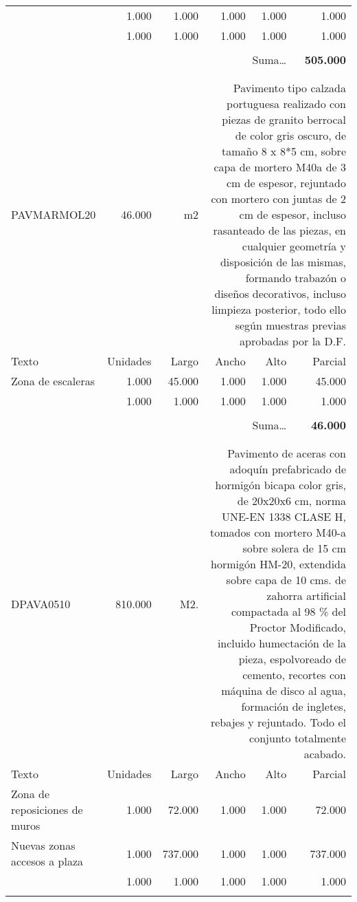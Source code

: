 \documentclass{book}%
\begin{document}
\begin{longtable}{lrrrrr}
\multicolumn{1}{p{3.5cm}}{}&1.000&1.000&1.000&1.000&1.000\\%
\multicolumn{1}{p{3.5cm}}{}&1.000&1.000&1.000&1.000&1.000\\%
&&&&&\\%
\multicolumn{5}{r}{Suma\ldots}&\textbf{505.000}\\%
\hline%
&&&&&\\%
&&&&&\\%
PAVMARMOL20&46.000& m2&\multicolumn{3}{p{6cm}}{\scriptsize Pavimento tipo calzada portuguesa realizado con piezas de granito berrocal de color gris oscuro, de tamaño 8 x 8*5 cm, sobre capa de mortero M40a de 3 cm de espesor, rejuntado con mortero con juntas de 2 cm de espesor, incluso rasanteado de las piezas, en cualquier geometría y disposición de las mismas, formando trabazón o diseños decorativos, incluso limpieza posterior, todo ello según muestras previas aprobadas por la D.F.\normalsize}\\%
Texto&Unidades&Largo&Ancho&Alto&Parcial\\%
\hline%
\multicolumn{1}{p{3.5cm}}{Zona de escaleras}&1.000&45.000&1.000&1.000&45.000\\%
\multicolumn{1}{p{3.5cm}}{}&1.000&1.000&1.000&1.000&1.000\\%
&&&&&\\%
\multicolumn{5}{r}{Suma\ldots}&\textbf{46.000}\\%
\hline%
&&&&&\\%
&&&&&\\%
DPAVA0510&810.000& M2.&\multicolumn{3}{p{6cm}}{\scriptsize Pavimento de aceras con adoquín prefabricado de hormigón bicapa color gris, de 20x20x6 cm, norma UNE-EN 1338 CLASE H, tomados con mortero M40-a sobre solera de 15 cm hormigón HM-20, extendida sobre capa de 10 cms. de zahorra artificial compactada al 98 \% del Proctor Modificado, incluido humectación de la pieza, espolvoreado de cemento, recortes con máquina de disco al agua, formación de ingletes, rebajes y rejuntado. Todo el conjunto totalmente acabado.\normalsize}\\%
Texto&Unidades&Largo&Ancho&Alto&Parcial\\%
\hline%
\multicolumn{1}{p{3.5cm}}{Zona de reposiciones de muros}&1.000&72.000&1.000&1.000&72.000\\%
\multicolumn{1}{p{3.5cm}}{Nuevas zonas accesos a plaza}&1.000&737.000&1.000&1.000&737.000\\%
\multicolumn{1}{p{3.5cm}}{}&1.000&1.000&1.000&1.000&1.000\\%
&&&&&\\%

\end{longtable}
\end{document}
